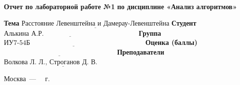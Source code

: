 \begin{titlepage}
	
	 \begin{center}
		\noindent\begin{minipage}{1.3\textwidth}\centering
			\Large\textbf{Отчет по лабораторной работе №1}\newline
			\textbf{по дисциплине «Анализ алгоритмов»}\newline\newline
		\end{minipage}
	\end{center}
	
	\noindent\textbf{Тема} $\underline{\text{Расстояние Левенштейна и Дамерау-Левенштейна}}$\newline\newline\newline
	\noindent\textbf{Студент} $\underline{\text{Алькина А.Р.~~~~~~~~~~~~~~~~~~~~~~~~~~~~~~~~~~~~~~~~~}}$\newline\newline
	\noindent\textbf{Группа} $\underline{\text{ИУ7-54Б~~~~~~~~~~~~~~~~~~~~~~~~~~~~~~~~~~~~~~~~~~~~~~~~~~}}$\newline\newline
	\noindent\textbf{Оценка (баллы)} $\underline{\text{~~~~~~~~~~~~~~~~~~~~~~~~~~~~~~~~~~~~~~~~~~~~~~~~~}}$\newline\newline
	\noindent\textbf{Преподаватели} $\underline{\text{Волкова Л.~Л., Строганов Д.~В.~~~~~~~~~~~}}$\newline
	
	\begin{center}
		\vfill
		Москва~---~\the\year
		~г.
	\end{center}
	\restoregeometry
\end{titlepage}
